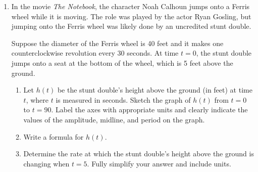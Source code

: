\documentclass{article}
\begin{document}
\begin{enumerate}



\pspace{\newpage}

\item
\begin{problem}
In the movie \emph{The Notebook}, the character Noah Calhoun jumps onto a Ferris wheel while it is moving. The role was played by the actor Ryan Gosling, but jumping onto the Ferris wheel was likely done by an uncredited stunt double.

Suppose the diameter of the Ferris wheel is 40 feet and it makes one counterclockwise revolution every 30 seconds. At time $t=0$, the stunt double jumps onto a seat at the bottom of the wheel, which is 5 feet above the ground.
\end{problem}

\begin{enumerate}
    \item 
    \begin{problem}
        Let $h(t)$ be the stunt double's height above the ground (in feet) at time $t$, where $t$ is measured in seconds. Sketch the graph of $h(t)$ from $t=0$ to $t=90$. Label the axes with appropriate units and clearly indicate the values of the amplitude, midline, and period on the graph.
    \end{problem}

    \item 
    \begin{problem}
        Write a formula for $h(t)$.
    \end{problem}

    \item 
    \begin{problem}
        Determine the rate at which the stunt double's height above the ground is changing when $t=5$. Fully simplify your answer and include units.
    \end{problem}


\end{enumerate}
\end{enumerate}
\end{document}
